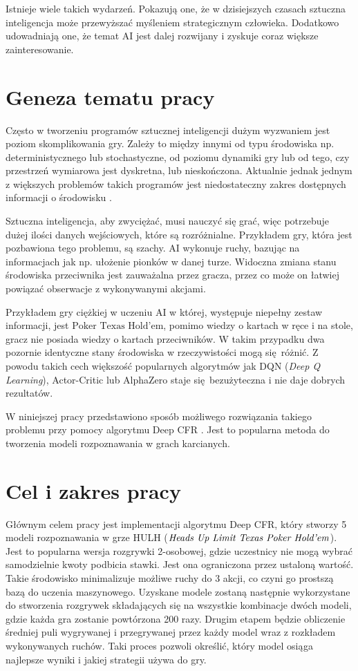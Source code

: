 \documentclass[12pt,oneside,a4paper]{report}
\begin{document}
Istnieje wiele takich wydarzeń. Pokazują one, że w dzisiejszych 
czasach sztuczna inteligencja może przewyższać myśleniem strategicznym człowieka. Dodatkowo 
udowadniają one, że
temat AI jest dalej rozwijany i zyskuje coraz większe zainteresowanie.   

\section{Geneza tematu pracy}

Często w tworzeniu programów sztucznej inteligencji dużym 
wyzwaniem jest poziom skomplikowania gry. 
Zależy to między innymi od typu środowiska np. deterministycznego lub stochastyczne, 
od poziomu dynamiki gry lub od tego, czy przestrzeń wymiarowa jest
dyskretna, lub nieskończona.
Aktualnie jednak jednym z większych problemów takich programów jest niedostateczny
zakres dostępnych informacji o środowisku \cite{iig}.

Sztuczna inteligencja, aby zwyciężać,
musi nauczyć się grać, więc potrzebuje dużej ilości danych wejściowych, które są 
rozróżnialne. Przykładem gry, która jest pozbawiona tego problemu, są szachy. 
AI wykonuje ruchy, bazując na informacjach jak np. ułożenie pionków
w danej turze. Widoczna zmiana stanu środowiska przeciwnika jest
zauważalna przez gracza, przez co może on łatwiej powiązać
obserwacje z wykonywanymi akcjami. 

Przykładem gry ciężkiej w uczeniu AI w której, występuje niepełny zestaw informacji, 
jest $\text{Poker Texas Hold'em}$, pomimo wiedzy o kartach w ręce i na stole, gracz nie posiada
wiedzy o 
kartach przeciwników. W takim przypadku dwa pozornie identyczne stany środowiska w
rzeczywistości mogą się różnić. Z powodu takich cech większość popularnych algorytmów jak 
DQN (\emph{Deep Q Learning}), Actor-Critic lub AlphaZero staje się bezużyteczna i nie daje dobrych rezultatów.

W niniejszej pracy przedstawiono sposób możliwego rozwiązania takiego problemu przy pomocy 
algorytmu Deep CFR \cite{DCFR}. Jest to popularna metoda do tworzenia modeli
rozpoznawania w grach karcianych.

\section{Cel i zakres pracy}

Głównym celem pracy jest implementacji algorytmu Deep CFR, który stworzy 5 modeli
rozpoznawania w grze HULH ($\text{\emph{Heads Up Limit Texas 
Poker Hold'em}}$). Jest to popularna wersja rozgrywki 2-osobowej, gdzie uczestnicy nie mogą wybrać
samodzielnie kwoty podbicia stawki. Jest ona ograniczona przez ustaloną wartość. Takie środowisko
minimalizuje możliwe ruchy do 3 akcji, co czyni go prostszą bazą do uczenia maszynowego. Uzyskane modele zostaną następnie 
wykorzystane do stworzenia
rozgrywek składających się na wszystkie kombinacje dwóch modeli, gdzie każda gra zostanie 
powtórzona 200 razy. Drugim etapem
będzie obliczenie średniej puli wygrywanej i przegrywanej przez każdy model wraz z rozkładem
wykonywanych ruchów.
Taki proces pozwoli określić, który model osiąga najlepsze wyniki i jakiej strategii używa do gry.
\end{document}
